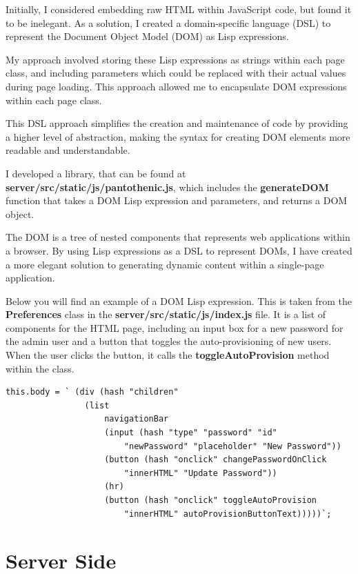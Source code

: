 Initially, I considered embedding raw HTML within JavaScript code,
but found it to be inelegant.
As a solution, I created a domain-specific language (DSL)
to represent the Document Object Model (DOM) as Lisp expressions.

My approach involved storing these Lisp expressions as strings within each page class,
and including parameters which could be replaced with their actual values during page loading.
This approach allowed me to encapsulate DOM expressions within each page class.

This DSL approach simplifies the creation and maintenance of code by providing a higher level of abstraction,
making the syntax for creating DOM elements more readable and understandable.

I developed a library, that can be found at \textbf{server/src/static/js/pantothenic.js},
which includes the \textbf{generateDOM} function that takes a
DOM Lisp expression and parameters,
and returns a DOM object.

The DOM is a tree of nested components that represents web applications within a browser.
By using Lisp expressions as a DSL to represent DOMs,
I have created a more elegant solution to generating dynamic
content within a single-page application.

Below you will find an example of a DOM Lisp expression.
This is taken from the \textbf{Preferences} class in the
\textbf{server/src/static/js/index.js} file.
It is a list of components for the HTML page,
including an input box for a new password for the admin user
and a button that toggles the auto-provisioning of new users.
When the user clicks the button, it calls the
\textbf{toggleAutoProvision} method within the class.

\begin{lstlisting}
this.body = ` (div (hash "children"
                (list
                    navigationBar
                    (input (hash "type" "password" "id"
                        "newPassword" "placeholder" "New Password"))
                    (button (hash "onclick" changePasswordOnClick
                        "innerHTML" "Update Password"))
                    (hr)
                    (button (hash "onclick" toggleAutoProvision
                        "innerHTML" autoProvisionButtonText)))))`;
\end{lstlisting}

\section{Server Side}

